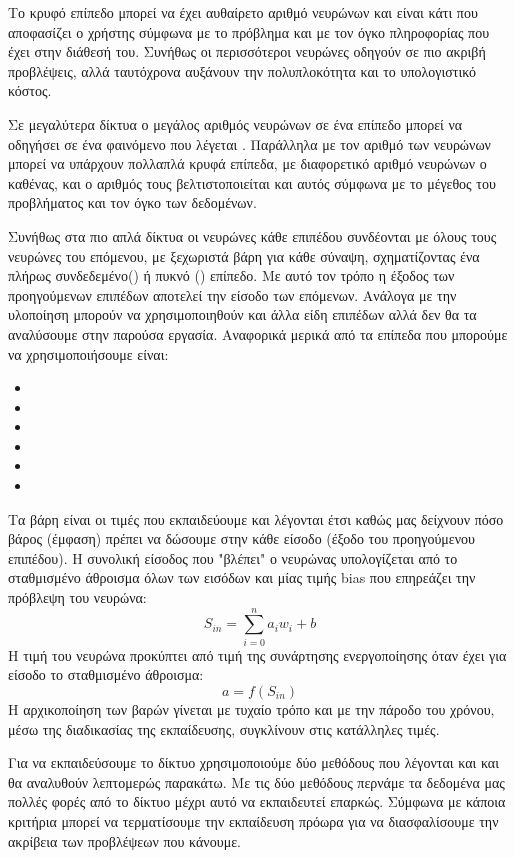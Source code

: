 Το
κρυφό επίπεδο μπορεί να έχει αυθαίρετο αριθμό νευρώνων και είναι κάτι που αποφασίζει ο χρήστης
σύμφωνα με το πρόβλημα και με τον όγκο πληροφορίας που έχει στην διάθεσή του. Συνήθως
οι περισσότεροι νευρώνες οδηγούν σε πιο ακριβή προβλέψεις, αλλά ταυτόχρονα αυξάνουν
την πολυπλοκότητα και το υπολογιστικό κόστος.

Σε μεγαλύτερα δίκτυα ο μεγάλος αριθμός
νευρώνων σε ένα επίπεδο μπορεί να οδηγήσει σε ένα φαινόμενο που λέγεται . Παράλληλα με τον αριθμό των νευρώνων μπορεί να υπάρχουν
πολλαπλά κρυφά επίπεδα, με διαφορετικό αριθμό νευρώνων ο καθένας, και ο αριθμός τους
βελτιστοποιείται και αυτός σύμφωνα με το μέγεθος του προβλήματος και τον όγκο των
δεδομένων.

Συνήθως στα πιο απλά δίκτυα οι νευρώνες κάθε επιπέδου συνδέονται με όλους τους
νευρώνες του επόμενου, με ξεχωριστά βάρη για κάθε σύναψη, σχηματίζοντας ένα πλήρως
συνδεδεμένο() ή πυκνό () επίπεδο. Με αυτό τον τρόπο η έξοδος των
προηγούμενων επιπέδων αποτελεί την είσοδο των επόμενων. Ανάλογα με την υλοποίηση
μπορούν να χρησιμοποιηθούν και άλλα είδη επιπέδων αλλά δεν θα τα αναλύσουμε στην
παρούσα εργασία. Αναφορικά μερικά από τα επίπεδα που μπορούμε να χρησιμοποιήσουμε
είναι:
\begin{itemize}
    \item {}
    \item {}
    \item {}
    \item {}
    \item {}
    \item {}
\end{itemize}

Τα βάρη είναι οι τιμές που εκπαιδεύουμε και λέγονται έτσι καθώς μας δείχνουν πόσο βάρος
(έμφαση) πρέπει να δώσουμε στην κάθε είσοδο (έξοδο του προηγούμενου επιπέδου). Η
συνολική είσοδος που "βλέπει" ο νευρώνας υπολογίζεται από το σταθμισμένο άθροισμα
όλων των εισόδων και μίας τιμής bias που επηρεάζει την πρόβλεψη του νευρώνα:
$$S_{in}=\sum\limits_{i=0}^na_iw_i+b$$
Η τιμή του νευρώνα προκύπτει από τιμή της συνάρτησης ενεργοποίησης όταν έχει για είσοδο
το σταθμισμένο άθροισμα:
$$a=f(S_{in})$$
Η αρχικοποίηση των βαρών γίνεται με τυχαίο τρόπο και με την πάροδο του χρόνου, μέσω της
διαδικασίας της εκπαίδευσης, συγκλίνουν στις κατάλληλες τιμές.

Για να εκπαιδεύσουμε το δίκτυο χρησιμοποιούμε δύο μεθόδους που λέγονται  και
 και θα αναλυθούν λεπτομερώς παρακάτω. Με τις δύο μεθόδους περνάμε
τα δεδομένα μας πολλές φορές από το δίκτυο μέχρι αυτό να εκπαιδευτεί επαρκώς. Σύμφωνα
με κάποια κριτήρια μπορεί να τερματίσουμε την εκπαίδευση πρόωρα για να διασφαλίσουμε
την ακρίβεια των προβλέψεων που κάνουμε.
